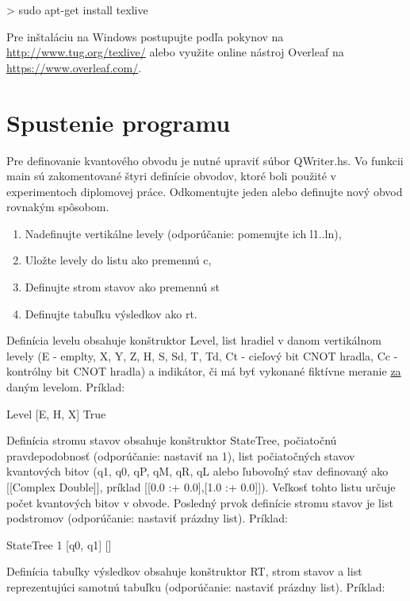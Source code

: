 \begin{code}
> sudo apt-get install texlive
\end{code}

Pre inštaláciu na Windows postupujte podľa pokynov na \url{http://www.tug.org/texlive/} 
alebo využite online nástroj Overleaf na \url{https://www.overleaf.com/}.

\section{Spustenie programu}

Pre definovanie kvantového obvodu je nutné upraviť súbor QWriter.hs. Vo 
funkcii main sú zakomentované štyri definície obvodov, ktoré boli použité 
v experimentoch diplomovej práce. Odkomentujte jeden alebo definujte nový
obvod rovnakým spôsobom. 

\begin{enumerate}
    \item Nadefinujte vertikálne levely (odporúčanie: pomenujte ich l1..ln),
    \item Uložte levely do listu ako premennú c,
    \item Definujte strom stavov ako premennú st
    \item Definujte tabuľku výsledkov ako rt.
\end{enumerate}

Definícia levelu obsahuje konštruktor Level, list hradiel v danom vertikálnom
levely (E - emplty, X, Y, Z, H, S, Sd, T, Td, Ct - cieľový bit CNOT hradla, 
Cc - kontrólny bit CNOT hradla) a indikátor, či má byť vykonané fiktívne
meranie \underline{za} daným levelom. Príklad:

\begin{code}
Level [E, H, X] True
\end{code}

Definícia stromu stavov obsahuje konštruktor StateTree, počiatočnú 
pravdepodobnosť (odporúčanie: nastaviť na 1), list počiatočných stavov
kvantových bitov (q1, q0, qP, qM, qR, qL alebo ľubovoľný stav definovaný
ako [[Complex Double]], príklad [[0.0 :+ 0.0],[1.0 :+ 0.0]]). 
Veľkosť tohto listu určuje počet kvantových bitov v obvode. Posledný prvok
definície stromu stavov je list podstromov (odporúčanie: nastaviť prázdny list).
Príklad:

\begin{code}
StateTree 1 [q0, q1] []
\end{code}

Definícia tabuľky výsledkov obsahuje konštruktor RT, strom stavov a list 
reprezentujúci samotnú tabuľku (odporúčanie: nastaviť prázdny list). Príklad:

